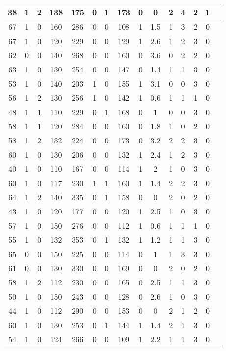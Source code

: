 \documentclass{article}
\begin{document}
\begin{longtable}{
|
c|c|c|c|c|c|c|c|c|c|c|c|c|c|c|}
\hline
38 & 1 & 2 & 138 & 175 & 0 & 1 & 173 & 0 & 0 & 2 & 4 & 2 & 1 \\
\hline
67 & 1 & 0 & 160 & 286 & 0 & 0 & 108 & 1 & 1.5 & 1 & 3 & 2 & 0 \\
\hline
67 & 1 & 0 & 120 & 229 & 0 & 0 & 129 & 1 & 2.6 & 1 & 2 & 3 & 0 \\
\hline
62 & 0 & 0 & 140 & 268 & 0 & 0 & 160 & 0 & 3.6 & 0 & 2 & 2 & 0 \\
\hline
63 & 1 & 0 & 130 & 254 & 0 & 0 & 147 & 0 & 1.4 & 1 & 1 & 3 & 0 \\
\hline
53 & 1 & 0 & 140 & 203 & 1 & 0 & 155 & 1 & 3.1 & 0 & 0 & 3 & 0 \\
\hline
56 & 1 & 2 & 130 & 256 & 1 & 0 & 142 & 1 & 0.6 & 1 & 1 & 1 & 0 \\
\hline
48 & 1 & 1 & 110 & 229 & 0 & 1 & 168 & 0 & 1 & 0 & 0 & 3 & 0 \\
\hline
58 & 1 & 1 & 120 & 284 & 0 & 0 & 160 & 0 & 1.8 & 1 & 0 & 2 & 0 \\
\hline
58 & 1 & 2 & 132 & 224 & 0 & 0 & 173 & 0 & 3.2 & 2 & 2 & 3 & 0 \\
\hline
60 & 1 & 0 & 130 & 206 & 0 & 0 & 132 & 1 & 2.4 & 1 & 2 & 3 & 0 \\
\hline
40 & 1 & 0 & 110 & 167 & 0 & 0 & 114 & 1 & 2 & 1 & 0 & 3 & 0 \\
\hline
60 & 1 & 0 & 117 & 230 & 1 & 1 & 160 & 1 & 1.4 & 2 & 2 & 3 & 0 \\
\hline
64 & 1 & 2 & 140 & 335 & 0 & 1 & 158 & 0 & 0 & 2 & 0 & 2 & 0 \\
\hline
43 & 1 & 0 & 120 & 177 & 0 & 0 & 120 & 1 & 2.5 & 1 & 0 & 3 & 0 \\
\hline
57 & 1 & 0 & 150 & 276 & 0 & 0 & 112 & 1 & 0.6 & 1 & 1 & 1 & 0 \\
\hline
55 & 1 & 0 & 132 & 353 & 0 & 1 & 132 & 1 & 1.2 & 1 & 1 & 3 & 0 \\
\hline
65 & 0 & 0 & 150 & 225 & 0 & 0 & 114 & 0 & 1 & 1 & 3 & 3 & 0 \\
\hline
61 & 0 & 0 & 130 & 330 & 0 & 0 & 169 & 0 & 0 & 2 & 0 & 2 & 0 \\
\hline
58 & 1 & 2 & 112 & 230 & 0 & 0 & 165 & 0 & 2.5 & 1 & 1 & 3 & 0 \\
\hline
50 & 1 & 0 & 150 & 243 & 0 & 0 & 128 & 0 & 2.6 & 1 & 0 & 3 & 0 \\
\hline
44 & 1 & 0 & 112 & 290 & 0 & 0 & 153 & 0 & 0 & 2 & 1 & 2 & 0 \\
\hline
60 & 1 & 0 & 130 & 253 & 0 & 1 & 144 & 1 & 1.4 & 2 & 1 & 3 & 0 \\
\hline
54 & 1 & 0 & 124 & 266 & 0 & 0 & 109 & 1 & 2.2 & 1 & 1 & 3 & 0 \\

\end{longtable}
\end{document}
